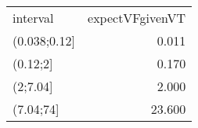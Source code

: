 \begin{table}[ht]
\centering
\begin{tabular}{lr}
 interval & expectVFgivenVT \\ 
 (0.038;0.12] & 0.011 \\ 
  (0.12;2] & 0.170 \\ 
  (2;7.04] & 2.000 \\ 
  (7.04;74] & 23.600 \\ 
  \end{tabular}
\end{table}
